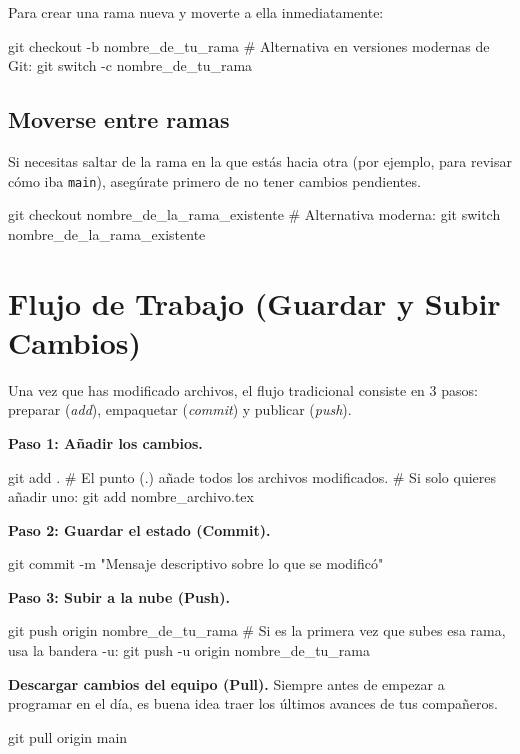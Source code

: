 \documentclass[letterpaper,12pt,oneside]{article}
\begin{document}
Para crear una rama nueva y moverte a ella inmediatamente:
\begin{gitbox}
git checkout -b nombre_de_tu_rama
# Alternativa en versiones modernas de Git:
git switch -c nombre_de_tu_rama
\end{gitbox}

\subsection{Moverse entre ramas}
Si necesitas saltar de la rama en la que estás hacia otra (por ejemplo, para revisar cómo iba \texttt{main}), asegúrate primero de no tener cambios pendientes.
\begin{gitbox}
git checkout nombre_de_la_rama_existente
# Alternativa moderna:
git switch nombre_de_la_rama_existente
\end{gitbox}

\section{Flujo de Trabajo (Guardar y Subir Cambios)}
Una vez que has modificado archivos, el flujo tradicional consiste en 3 pasos: preparar (\textit{add}), empaquetar (\textit{commit}) y publicar (\textit{push}).

\textbf{Paso 1: Añadir los cambios.} 
\begin{gitbox}
git add .
# El punto (.) añade todos los archivos modificados. 
# Si solo quieres añadir uno: git add nombre_archivo.tex
\end{gitbox}

\textbf{Paso 2: Guardar el estado (Commit).}
\begin{gitbox}
git commit -m "Mensaje descriptivo sobre lo que se modificó"
\end{gitbox}

\textbf{Paso 3: Subir a la nube (Push).}
\begin{gitbox}
git push origin nombre_de_tu_rama
# Si es la primera vez que subes esa rama, usa la bandera -u:
git push -u origin nombre_de_tu_rama
\end{gitbox}

\textbf{Descargar cambios del equipo (Pull).}
Siempre antes de empezar a programar en el día, es buena idea traer los últimos avances de tus compañeros.
\begin{gitbox}
git pull origin main
\end{gitbox}
\end{document}
